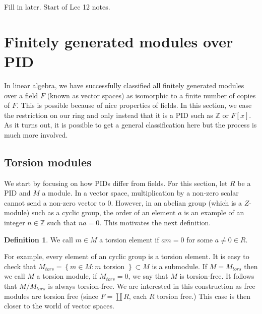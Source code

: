 \documentclass{article}
\newcommand\Z{\ensuremath{\mathbb{Z}}}
\theoremstyle{definition}
\newtheorem{definition}{Definition}[subsection]
\theoremstyle{remark}
\theoremstyle{plain}
\begin{document}
Fill in later. Start of Lec 12 notes.

\section{Finitely generated modules over PID}

In linear algebra, we have successfully classified all finitely generated modules over a field \(F\) (known as vector spaces) as isomorphic to a finite number of copies 
of \(F\). This is possible because of nice properties of fields. In this section, we ease the restriction on our ring and only instead that it is a PID such as \(\Z\) or \(F[x]\).
As it turns out, it is possible to get a general classification here but the process is much more involved. 

\subsection{Torsion modules}

We start by focusing on how PIDs differ from fields. For this section, let \(R\) be a PID and \(M\) a module. In a vector space, multiplication by a non-zero scalar cannot 
send a non-zero vector to \(0\). However, in an abelian group (which is a \(Z\)-module) such as a cyclic group, the order of an element \(a\) is an example of an integer \(n \in \Z\) such that \(na = 0\).
This motivates the next definition. 

\begin{definition}
    We call \(m \in M\) a torsion element if \(am = 0\) for some \(a \neq 0 \in R\).
\end{definition}

For example, every element of an cyclic group is a torsion element. It is easy to check that \(M_{tors} = \left\{ m \in M: m\text{ torsion } \right\}\subset M\) is a submodule. 
If \(M = M_{tors}\) then we call \(M\) a torsion module, if \(M_{tors} = 0\), we say that \(M\) is torsion-free. It follows that \(M/M_{tors}\) is always torsion-free. We are interested in this
construction as free modules are torsion free (since \(F = \coprod R\), each \(R\) torsion free.) This case is then closer to the world of vector spaces.  
\end{document}
